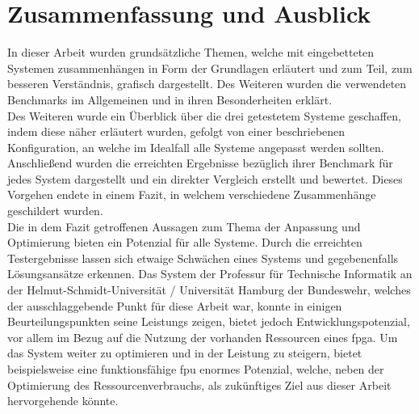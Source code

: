 \chapter{Zusammenfassung und Ausblick}\label{ch:schluss}
In dieser Arbeit wurden grundsätzliche Themen, welche mit eingebetteten Systemen zusammenhängen in Form der Grundlagen erläutert und zum Teil,
 zum besseren Verständnis, grafisch dargestellt. Des Weiteren wurden die verwendeten Benchmarks im Allgemeinen und in ihren Besonderheiten erklärt.\\
 Des Weiteren wurde ein Überblick über die drei getestetem Systeme geschaffen, indem diese näher erläutert wurden, gefolgt von einer beschriebenen Konfiguration,
 an welche im Idealfall alle Systeme angepasst werden sollten. Anschließend wurden die erreichten Ergebnisse bezüglich ihrer Benchmark für jedes
 System dargestellt und ein direkter Vergleich erstellt und bewertet. Dieses Vorgehen endete in einem Fazit, in welchem verschiedene Zusammenhänge geschildert wurden.\\
Die in dem Fazit getroffenen Aussagen zum Thema der Anpassung und Optimierung bieten ein Potenzial für alle Systeme. Durch die erreichten Testergebnisse lassen sich etwaige
Schwächen eines Systems und gegebenenfalls Lösungsansätze erkennen. Das System der Professur für Technische Informatik an der Helmut-Schmidt-Universität / Universität Hamburg
der Bundeswehr, welches der ausschlaggebende Punkt für diese Arbeit war, konnte in einigen Beurteilungspunkten seine Leistungs zeigen, bietet jedoch Entwicklungspotenzial,
vor allem im Bezug auf die Nutzung der vorhanden Ressourcen eines \ac{fpga}. Um das System weiter zu optimieren und in der Leistung zu steigern, bietet beispielsweise eine
funktionsfähige \ac{fpu} enormes Potenzial, welche, neben der Optimierung des Ressourcenverbrauchs, als zukünftiges Ziel aus dieser Arbeit hervorgehende könnte. 
